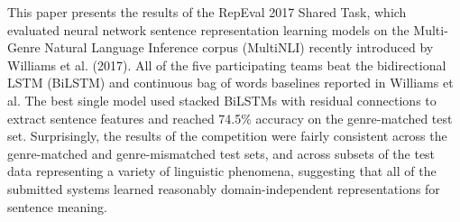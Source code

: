This paper presents the results of the RepEval 2017 Shared Task, which evaluated neural network sentence representation learning models on the Multi-Genre Natural Language Inference corpus (MultiNLI) recently introduced by Williams et al. (2017). All of the five participating teams beat the bidirectional LSTM (BiLSTM) and continuous bag of words baselines reported in Williams et al. The best single model used stacked BiLSTMs with residual connections to extract sentence features and reached 74.5\% accuracy on the genre-matched test set. Surprisingly, the results of the competition were fairly consistent across the genre-matched and genre-mismatched test sets, and across subsets of the test data representing a variety of linguistic phenomena, suggesting that all of the submitted systems learned reasonably domain-independent representations for sentence meaning.
